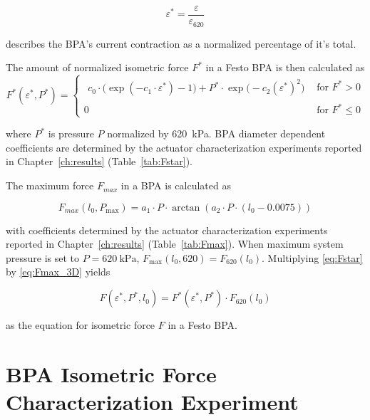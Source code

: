 \begin{equation}
    \varepsilon^* = \frac{\varepsilon}{\varepsilon_{620}} \label{eq:rel_strain}
\end{equation}

describes the BPA's current contraction as a normalized percentage of it's total.

The amount of normalized isometric force $F^*$ in a Festo BPA is then calculated as
\begin{equation}
F^*(\varepsilon^*,P^*)=
\begin{cases}
\begin{aligned}
c_0\cdot\bigl(\exp(-c_1 \cdot \varepsilon^*)-1\bigr)
+ P^*\cdot\exp\!\bigl(-c_2(\varepsilon^*)^{2}\bigr)
\end{aligned}
& \text{for } F^*>0\\[10pt]
0
& \text{for } F^*\le 0
\end{cases}\label{eq:Fstar}
\end{equation}

where $P^*$ is pressure $P$ normalized by \qty{620}{\kPa}. BPA diameter dependent coefficients are determined by the actuator characterization experiments reported in Chapter~\ref{ch:results} (Table~\ref{tab:Fstar}).

The maximum force $F_{max}$ in a BPA is calculated as

\begin{equation}
    F_{max}(l_{0},P_\text{max}) = a_1 \cdot P \cdot \arctan{(a_2 \cdot P \cdot (l_{0}-0.0075))} \label{eq:Fmax_3D}
\end{equation}

with coefficients determined by the actuator characterization experiments reported in Chapter~\ref{ch:results} (Table~\ref{tab:Fmax}). When maximum system pressure is set to $P=\qty{620}{\kPa}$, $F_\text{max}(l_{0},620) = F_{620}(l_{0})$. Multiplying \eqref{eq:Fstar} by \eqref{eq:Fmax_3D} yields

 \begin{equation}
   F(\varepsilon^*,P^*,l_{0}) = F^*(\varepsilon^*,P^*) \cdot F_{620}(l_{0}) \label{eq:force}
\end{equation}

as the equation for isometric force $F$ in a Festo BPA.

\section{BPA Isometric Force Characterization Experiment}\label{sec:force_experiment}


